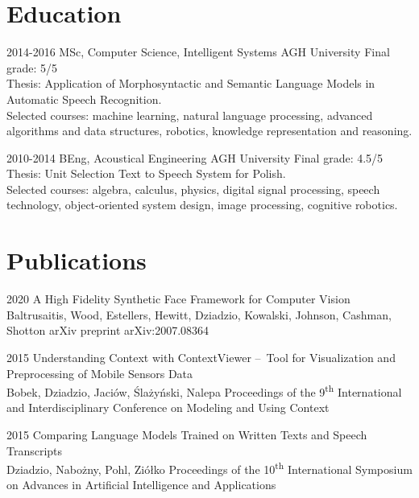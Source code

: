 \documentclass[]{friggeri-cv_osx}
\begin{document}
\section{Education}
\begin{entrylist}
\entry
{2014-2016}
{MSc, Computer Science, Intelligent Systems}
{AGH University}
{Final grade: 5/5\\
Thesis: Application of Morphosyntactic and Semantic Language Models in Automatic Speech Recognition.\\
Selected courses: machine learning, natural language processing, advanced algorithms and data structures, robotics, knowledge representation and reasoning.\\}

\entry
{2010-2014}
{BEng, Acoustical Engineering}
{AGH University}
{Final grade: 4.5/5\\
Thesis: Unit Selection Text to Speech System for Polish.\\
Selected courses: algebra, calculus, physics, digital signal processing, speech technology, object-oriented system design, image processing, cognitive robotics.}
\end{entrylist}


\newpage
\section{Publications}
\begin{entrylist}
\entry
{2020}
{A High Fidelity Synthetic Face Framework for Computer Vision\\}
{Baltrusaitis, Wood, Estellers, Hewitt, Dziadzio, Kowalski, Johnson, Cashman, Shotton}
{arXiv preprint arXiv:2007.08364\\}

\entry
{2015}
{Understanding Context with ContextViewer – Tool for Visualization and Preprocessing of Mobile Sensors Data\\}
{Bobek, Dziadzio, Jaciów, Ślażyński, Nalepa}
{Proceedings of the 9\textsuperscript{th} International and Interdisciplinary Conference on Modeling and Using Context\\}

\entry
{2015}
{Comparing Language Models Trained on Written Texts and Speech Transcripts\\}
{Dziadzio, Nabożny, Pohl, Ziółko}
{Proceedings of the 10\textsuperscript{th} International Symposium on Advances in Artificial Intelligence and Applications\\}
\end{entrylist}
\end{document}
